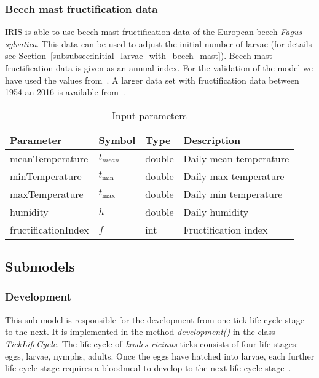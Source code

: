 \documentclass[a4paper, 11pt]{scrartcl}
\begin{document}


\subsubsection{Beech mast fructification data}\label{subsubsec:beech_mast_data}
IRIS is able to use beech mast fructification data of the European beech \textit{Fagus sylvatica}. This data can be used to adjust the initial number of larvae
(for details see Section~\ref{subsubsec:initial_larvae_with_beech_mast}). Beech mast fructification data is given as an annual index. For the validation of the model we have
used the values from~\cite{Brugger.2018}. A larger data set with fructification data between 1954 an 2016 is available from~\cite{Konnert.2016}.


\begin{table}[h!]
\caption{Input parameters}
\label{tab:input_parameters}
\begin{tabularx}{\textwidth}{llll}
\toprule
\textbf{Parameter} & \textbf{Symbol} & \textbf{Type}     & \textbf{Description}       \\
\midrule
meanTemperature    & $t_{mean}$      & double            & Daily mean temperature     \\
minTemperature     & $t_{\min}$      & double            & Daily max temperature      \\
maxTemperature     & $t_{\max}$      & double            & Daily min temperature      \\
humidity           & $h$             & double            & Daily humidity             \\
\midrule
fructificationIndex & $f$            & int               & Fructification index       \\
\bottomrule
\end{tabularx}
\end{table}


\newpage
\subsection{Submodels}

\subsubsection{Development}
This sub model is responsible for the development from one tick life cycle stage to the next. It is implemented in the method \textit{development()} in the class
\textit{TickLifeCycle}. The life cycle of \textit{Ixodes ricinus} ticks consists of four life stages: eggs, larvae, nymphs, adults. Once the eggs have hatched into larvae, each
further life cycle stage requires a bloodmeal to develop to the next life cycle stage~\parencite{tba}.
\end{document}
